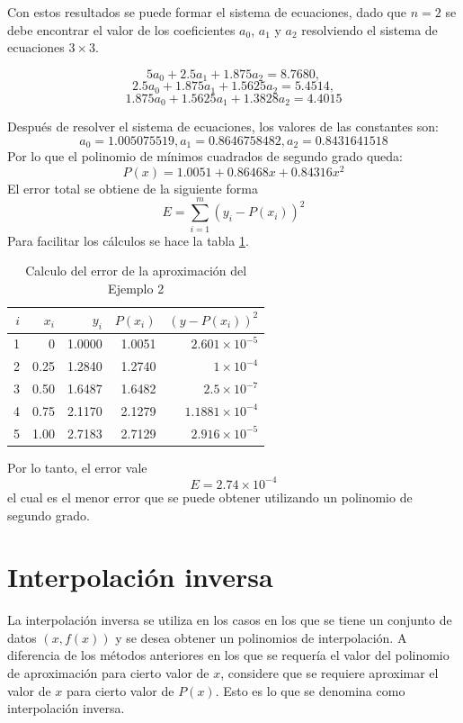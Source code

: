 \begin{exerciseT}
	Con estos resultados se puede formar el sistema de ecuaciones, dado que $n=2$ se debe encontrar el valor de los coeficientes
	$a_0$, $a_1$ y $a_2$ resolviendo el sistema de ecuaciones $3\times 3$.
 
	$$5a_0 + 2.5a_1 + 1.875a_2 = 8.7680,$$
	$$2.5a_0 + 1.875a_1 + 1.5625a_2 = 5.4514,$$
	$$1.875a_0 + 1.5625a_1 + 1.3828a_2 = 4.4015$$  
  
	Después de resolver el sistema de ecuaciones, los valores de las constantes son:
	$$a_0 = 1.005075519, a_1 = 0.8646758482, a_2 = 0.8431641518$$
	Por lo que el polinomio de mínimos cuadrados de segundo grado queda:
	$$P(x) = 1.0051 + 0.86468x + 0.84316x^2$$
	El error total se obtiene de la siguiente forma
	$$E = \sum_{i=1}^m (y_i - P(x_i))^2$$
	Para facilitar los cálculos se hace la tabla \ref{table:minimosCuadrados4}.
\begin{table}[H]
	\centering
	\begin{tabular}{rrrrr}
		\toprule
		$i$ & $x_i$ & $y_i$ & $P(x_i)$ & $(y-P(x_i))^2$\\\midrule
   		1 & 0 & 1.0000 & 1.0051 & $2.601\times 10^{-5}$\\
   		2 & 0.25 & 1.2840 & 1.2740 & $1\times 10^{-4}$\\
   		3 & 0.50 & 1.6487 & 1.6482 & $2.5\times 10^{-7}$\\
   		4 & 0.75 & 2.1170 & 2.1279 & $1.1881\times 10^{-4}$\\
   		5 & 1.00 & 2.7183 & 2.7129 & $2.916\times 10^{-5}$\\
   		\bottomrule
	\end{tabular}
	\caption{Calculo del error de la aproximación del Ejemplo 2}
	\label{table:minimosCuadrados4}
\end{table}	
Por lo tanto, el error vale
$$E = 2.74\times 10^{-4}$$
el cual es el menor error que se puede obtener utilizando un polinomio de segundo grado.  
\end{exerciseT}


\section{Interpolación inversa}

La interpolación inversa se utiliza en los casos en los que se tiene un conjunto de datos $(x,f(x))$ y se desea obtener un polinomios de interpolación.
A diferencia de los métodos anteriores en los que se requería el valor del polinomio de aproximación para cierto valor de $x$, considere que se requiere 
aproximar el valor de $x$ para cierto valor de $P(x)$. Esto es lo que se denomina como interpolación inversa.

